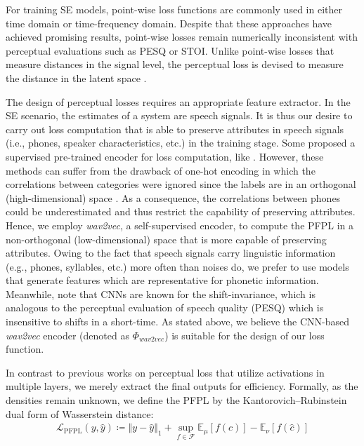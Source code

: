 \documentclass[a4paper]{article}
\begin{document}
For training SE models, point-wise loss functions are commonly used in either time domain or time-frequency domain. Despite that these approaches have achieved promising results, point-wise losses remain numerically inconsistent with perceptual evaluations such as PESQ or STOI. Unlike point-wise losses that measure distances in the signal level, the perceptual loss is devised to measure the distance in the latent space \cite{johnson2016perceptual}. \par
The design of perceptual losses requires an appropriate feature extractor. In the SE scenario, the estimates of a system are speech signals. It is thus our desire to carry out loss computation that is able to preserve attributes in speech signals (i.e., phones, speaker characteristics, etc.) in the training stage. Some proposed a supervised pre-trained encoder for loss computation, like \cite{germain2019speech}. However, these methods can suffer from the drawback of one-hot encoding in which the correlations between categories were ignored since the labels are in an orthogonal (high-dimensional) space \cite{rodriguez2018beyond}. As a consequence, the correlations between phones could be underestimated and thus restrict the capability of preserving attributes. Hence, we employ {\it wav2vec}, a self-supervised encoder, to compute the PFPL in a non-orthogonal (low-dimensional) space that is more capable of preserving attributes. Owing to the fact that speech signals carry linguistic information (e.g., phones, syllables, etc.) more often than noises do, we prefer to use models that generate features which are representative for phonetic information. Meanwhile, note that CNNs are known for the shift-invariance, which is analogous to the perceptual evaluation of speech quality (PESQ) \cite{PESQ} which is insensitive to shifts in a short-time. As stated above, we believe the CNN-based \textit{wav2vec} encoder (denoted as $\Phi_{\textit{wav2vec}}$) is suitable for the design of our loss function. \par
In contrast to previous works on perceptual loss that utilize activations in multiple layers, we merely extract the final outputs for efficiency. Formally, as the densities remain unknown, we define the PFPL by the Kantorovich--Rubinstein \cite{optimaltransport} dual form of Wasserstein distance:
\begin{align}
    \label{eq:loss}
    \mathcal{L}_{\mathrm{PFPL}}(y, \hat{y}) \coloneqq 
    \left\Vert y - \hat{y} \right\Vert_1+\sup_{f\in\mathcal{F}} 
    \mathbb{E}_{\mu}\left[f(c)\right] -
    \mathbb{E}_{\nu}\left[f(\hat{c})\right]
\end{align}
\end{document}
